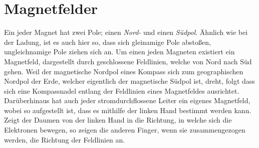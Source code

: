 \documentclass{article}
\begin{document}
\section{Magnetfelder}
Ein jeder Magnet hat zwei Pole; einen \emph{Nord-} und einen \emph{Südpol}. Ähnlich wie bei der Ladung, ist es auch hier so, dass sich gleinamige Pole abstoßen, ungleichnamige Pole ziehen sich an. \newline  
Um einen jeden Magneten existiert ein Magnetfeld, dargestellt durch geschlossene Feldlinien, welche von Nord nach Süd gehen. Weil der magnetische Nordpol eines Kompass sich zum geographischen Nordpol der Erde, welcher eigentlich der magnetische Südpol ist, dreht, folgt dass sich eine Kompassnadel entlang der Feldlinien eines Magnetfeldes ausrichtet. \newline 
Darüberhinaus hat auch jeder stromdurchflossene Leiter ein eigenes Magnetfeld, wobei so aufgestellt ist, dass es mithilfe der linken Hand bestimmt werden kann. Zeigt der Daumen von der linken Hand in die Richtung, in welche sich die Elektronen bewegen, so zeigen die anderen Finger, wenn sie zusammengezogen werden, die Richtung der Feldlinien an. 
\end{document}
